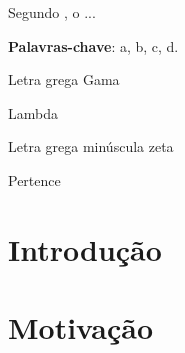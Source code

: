 \documentclass[12pt,openright,oneside,a4paper,brazil]{abntex2} %
\begin{document}
\setlength{\absparsep}{18pt} %
\begin{resumo}
 Segundo \cite{ibge1993}, o ...

 \textbf{Palavras-chave}: a, b, c, d.
\end{resumo}

\listoffigures*
\cleardoublepage

\listoftables*
\cleardoublepage

\begin{simbolos}
\item[$ \Gamma $] Letra grega Gama
\item[$ \Lambda $] Lambda
\item[$ \zeta $] Letra grega minúscula zeta
\item[$ \in $] Pertence
\end{simbolos}

\tableofcontents*
\cleardoublepage

\textual

\chapter{Introdução}
\setcounter{page}{1} %

\chapter{Motivação}

\postextual

\end{document}
